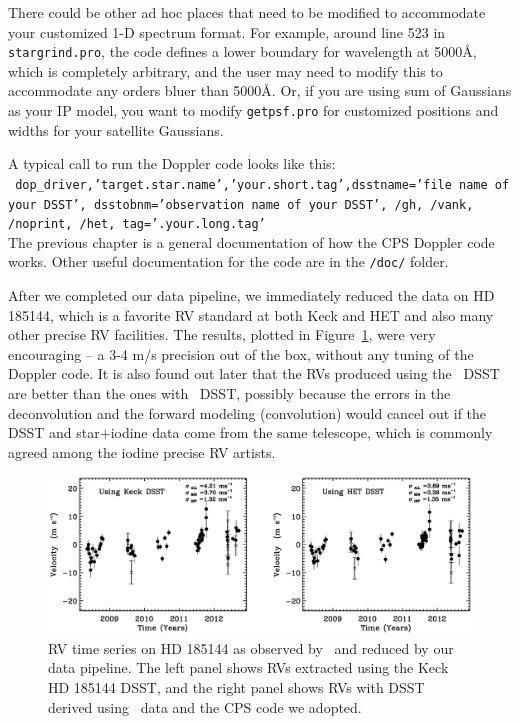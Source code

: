 There could be other ad hoc places that need to be modified to
accommodate your customized 1-D spectrum format. For example, around
line 523 in {\tt stargrind.pro}, the code defines a lower boundary for
wavelength at 5000\AA, which is completely arbitrary, and the user may
need to modify this to accommodate any orders bluer than 5000\AA. Or,
if you are using sum of Gaussians as your IP model, you want to modify
{\tt getpsf.pro} for customized positions and widths for your
satellite Gaussians.

A typical call to run the Doppler code looks like this:\\
{\tt
  dop\_driver,'target.star.name','your.short.tag',dsstname='file name
  of your DSST', dsstobnm='observation name of your
  DSST', /gh, /vank, /noprint, /het, tag='.your.long.tag'
} \\ 
The previous chapter is a general documentation of how the CPS Doppler
code works. Other useful documentation for the code are in the {\tt /doc/}
folder.

After we completed our data pipeline, we immediately reduced the data
on HD 185144, which is a favorite RV standard at both Keck and HET and
also many other precise RV facilities. The results, plotted in
Figure~\ref{het:fig:sigdra}, were very encouraging -- a 3-4 m/s
precision out of the box, without any tuning of the Doppler
code. It is also found out later that the RVs produced using the \het\
DSST are better than the ones with \keck\ DSST, possibly because the
errors in the deconvolution and the forward modeling (convolution)
would cancel out if the DSST and star$+$iodine data come from the same
telescope, which is commonly agreed among the iodine precise RV artists.

\begin{figure}
\centering
\includegraphics[scale=0.3]{het/sigdra.eps}
\caption{RV time series on HD 185144 as observed by \het\ and reduced
  by our data pipeline. The left panel shows RVs extracted using the
  Keck HD 185144 DSST, and the right panel shows RVs with DSST derived
  using \het\ data and the CPS code we adopted.
\label{het:fig:sigdra}}
\end{figure}

